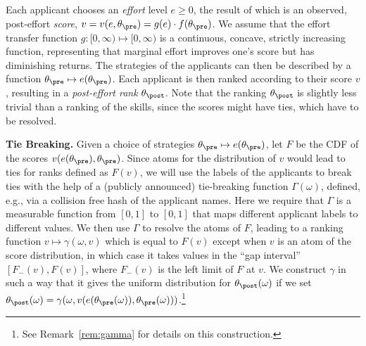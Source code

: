\documentclass[10pt]{article}
\begin{document}
\begin{ReviewVerbatim}


Each applicant chooses an \textit{effort} level $e \ge 0$, the result of which is an observed, post-effort \textit{score}, {$v=v(e,\theta_\pre) = {g(e)}\cdot{f(\theta_\pre)}$}. 
{We assume} that the effort transfer function $g: [0, \infty) \mapsto [0, \infty)$ is a continuous, concave, strictly increasing function, representing that marginal effort improves one's score but has diminishing returns.
{%
{T}he strategies of the applicants can {then} be described by a function $\theta_\pre \mapsto e(\theta_\pre)$.
}
  Each {applicant} is then ranked according to their score $v$%
, resulting in a \textit{post-effort rank} $\theta_\post$.
Note that the ranking $\theta_\post$ is slightly less trivial than a ranking of the skills, since the scores might have ties, which have to be resolved.

{\textbf{Tie Breaking.}
Given a choice of strategies $\theta_\pre \mapsto e(\theta_\pre)$, let $F$ be the CDF of the scores $v(e(\theta_\pre),\theta_\pre)$.
Since atoms for the distribution of $v$ would lead to ties for ranks defined as $F(v)$, we will use the labels of the applicants to break ties with the help of a (publicly announced) tie-breaking function $\Gamma(\omega)$, defined, e.g., via a collision free hash of the applicant names. Here  we require  that $\Gamma$  is a measurable function from $[0,1]$ to $[0,1]$ that maps different applicant labels to different values.
We then use $\Gamma$ to resolve the atoms of $F$, leading to a ranking function $v\mapsto \gamma(\omega, v)$ which is equal to $F(v)$ except when $v$ is an atom of the score distribution, {in which case it takes values in the ``gap interval'' $[F_-(v),  F(v)]$, where $F_-(v)$ is the left limit of $F$ at $v$.}  We  construct $\gamma$ in such a way that it
gives the uniform distribution for $\theta_\post(\omega)$ if we set  $\theta_\post(\omega)=\gamma(\omega,v(e(\theta_\pre(\omega)),\theta_\pre(\omega)))$.\footnote{See Remark~\ref{rem:gamma} for details on this construction.}

}
\end{ReviewVerbatim}
\end{document}
